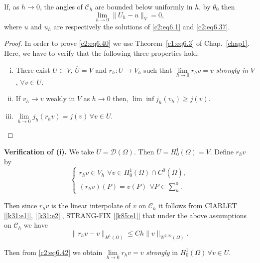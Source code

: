 \begin{theorem}\label{c2:thm6.5}%
If, as $h \to 0$, the angles of $\mathscr{C}_h$ are bounded below
uniformly in $h$, by $\theta_0$ then  
\begin{equation}
\lim_{h \to 0} \parallel  U_h - u\parallel_V =0 ,\tag{6.40}\label{c2:eq6.40} 
\end{equation}\pageoriginale 
where $u$ and $u_h$ are respectively the solutions of \eqref{c2:eq6.1} and
\eqref{c2:eq6.37}. 
\end{theorem}

\begin{proof}
In order to prove \eqref{c2:eq6.40} we use Theorem~\ref{c1:eq6.3} of
Chap.~\ref{chap1}. Here, we have to verify that the following three
properties hold: 
\begin{enumerate}[(i)]
\item There exist $U \subset V$, $\overline{U} = V$ and $r_h : U \to
  V_h$ such that $\lim\limits_{h \to 0} r_h v = v$ {\em strongly in}
  $V$, $\forall v \in U$. 
\item If $v_h \to v$ weakly in $V$ as $h \to 0$ then, $\lim \inf j_h
  (v_h) \geq j(v)$. 
\item $\lim\limits_{h \to 0} j_h (r_h v) = j (v)\, \forall  v \in
  U$.  
\end{enumerate}
\end{proof}

\medskip
\noindent 
\textbf{Verification of (i).}%
We take $U = \mathscr{D} (\Omega)$. Then $\overline{U} = H^1_0
(\Omega)= V$. Define $r_h v$ by  
\begin{equation}
\begin{cases}
r_h v \in V_h ~\, \forall  v \in H^1_0 (\Omega ) \cap C^0
(\overline{\Omega}),\\ 
(r_h v) (P) = v(P) ~\, \forall  P \in \sum^0_h.
\end{cases}
\tag{6.41}\label{c2:eq6.41}
\end{equation}

Then since $r_h v$ is the linear interpolate of $v$ on $\mathscr{C}_h$
it follows from CIARLET [\ref{k31:e1}], [\ref{k31:e2}], STRANG-FIX
[\ref{k85:e1}] that under the above
assumptions on $\mathscr{C}_h$ we have  
\begin{equation}
\parallel r_h v- v\parallel_{H^1 (\Omega)} \leq C h \parallel  v \parallel_{W^{2,
    \infty}(\Omega)}. \tag{6.42}\label{c2:eq6.42} 
\end{equation}

Then from \eqref{c2:eq6.42} we obtain $\lim\limits_{h \to 0} r_h v =
v$ \textit{ strongly } in $H^1_0 (\Omega )\, \forall  v \in U$. 

